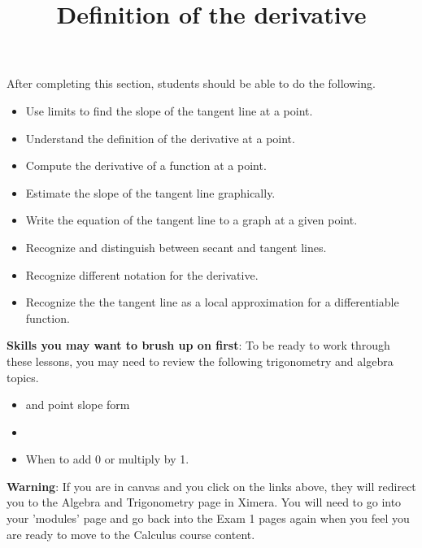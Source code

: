 \documentclass{ximera}
\title{Definition of the derivative}
\begin{document}
\begin{abstract}
\end{abstract}

\maketitle

\begin{sectionOutcomes}

After completing this section, students should be able to do the following.

\begin{itemize}
\item Use limits to find the slope of the tangent line at a point.
\item Understand the definition of the derivative at a point.
\item Compute the derivative of a function at a point.
\item Estimate the slope of the tangent line graphically.
\item Write the equation of the tangent line to a graph at a given point.
\item Recognize and distinguish between secant and tangent lines.
\item Recognize different notation for the derivative.
\item Recognize the the tangent line as a local approximation for a
  differentiable function.
\end{itemize}

\end{sectionOutcomes}

\bigskip

\textbf{Skills you may want to brush up on first}: To be ready to work
through these lessons, you may need to review the following trigonometry and algebra topics.
\begin{itemize}
    \item {} and point slope form%
    \item {}
    \item When to add 0 or multiply by 1.
\end{itemize}

\bigskip

\textbf{Warning}: If you are in canvas and you click on the links above, they will redirect you
to the Algebra and Trigonometry page in Ximera. You will need to
go into your 'modules' page and go back into the Exam 1 pages again
when you feel you are ready to move to the Calculus course content.
\end{document}
